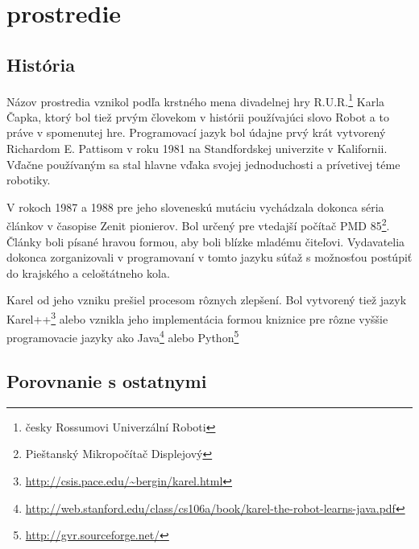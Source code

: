 \chapter{prostredie}

\section{História}

Názov prostredia vznikol podľa krstného mena divadelnej hry R.U.R.\footnote{česky Rossumovi Univerzální Roboti} Karla Čapka, ktorý bol tiež prvým človekom v histórii používajúci slovo Robot a to práve v spomenutej hre.
Programovací jazyk bol údajne\cite{karelnawiki} prvý krát vytvorený Richardom E. Pattisom v roku 1981 na Standfordskej univerzite v Kalifornii.
Vďačne používaným sa stal hlavne vďaka svojej jednoduchosti a prívetivej téme robotiky.

V rokoch 1987 a 1988 pre jeho sloveneskú mutáciu vychádzala dokonca séria článkov v časopise Zenit pionierov\cite{ZENIT}.
Bol určený pre vtedajší počítač PMD 85\footnote{Pieštanský Mikropočítač Displejový}.
Články boli písané hravou formou, aby boli blízke mladému čiteľovi. Vydavatelia dokonca zorganizovali v programovaní v tomto jazyku súťaž s možnosťou postúpiť do krajského a celoštátneho kola.

Karel od jeho vzniku prešiel procesom rôznych zlepšení.
Bol vytvorený tiež jazyk Karel++\footnote{\href{http://csis.pace.edu/~bergin/karel.html}{http://csis.pace.edu/\~{}bergin/karel.html}} alebo vznikla jeho implementácia formou kniznice pre rôzne vyššie programovacie jazyky ako Java\footnote{\href{http://web.stanford.edu/class/cs106a/book/karel-the-robot-learns-java.pdf}{http://web.stanford.edu/class/cs106a/book/karel-the-robot-learns-java.pdf}} alebo Python\footnote{\href{http://gvr.sourceforge.net/}{http://gvr.sourceforge.net/}}

\section{Porovnanie s ostatnymi}

